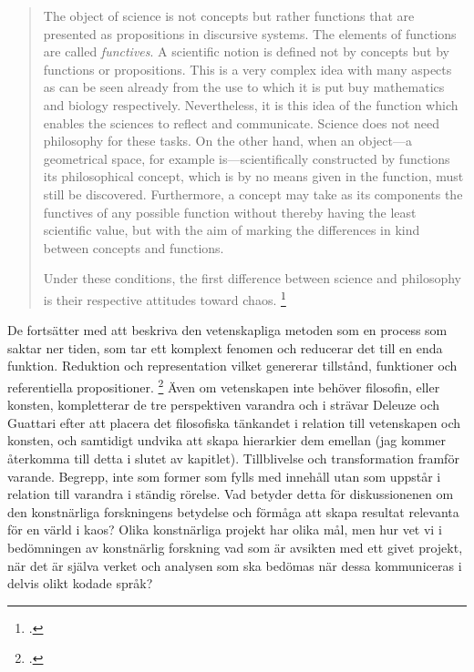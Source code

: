 \documentclass[11pt]{article}
\let\footnote=\endnote
\begin{document}
\begin{quote}
    The object of science is not concepts but rather functions that
    are presented as propositions in discursive systems. The elements
    of functions are called \emph{functives}. A scientific notion is
    defined not by concepts but by functions or propositions. This is
    a very complex idea with many aspects as can be seen already from
    the use to which it is put buy mathematics and biology
    respectively. Nevertheless, it is this idea of the function which
    enables the sciences to reflect and communicate. Science does not
    need philosophy for these tasks. On the other hand, when an
    object---a geometrical space, for example is---scientifically
    constructed by functions its philosophical concept, which is by no
    means given in the function, must still be
    discovered. Furthermore, a concept may take as its components the
    functives of any possible function without thereby having the
    least scientific value, but with the aim of marking the
    differences in kind between concepts and functions.

    Under these conditions, the first difference between science and
    philosophy is their respective attitudes toward
    chaos. \footcite[sid. 117-8]{deleuze1994}
\end{quote}

De fortsätter med att beskriva den vetenskapliga metoden som en
process som saktar ner tiden, som tar ett komplext fenomen och
reducerar det till en enda funktion. Reduktion och representation
vilket genererar tillstånd, funktioner och referentiella propositioner.
\footcite[sid. 197]{deleuze1994} Även om vetenskapen inte behöver
filosofin,\footnote{Närmast tvärtom mot vad de hävdade i \emph{Mille Plateaux}.} eller konsten, kompletterar de tre perspektiven varandra
och i  strävar Deleuze och Guattari efter att
placera det filosofiska tänkandet i relation till vetenskapen och
konsten, och samtidigt undvika att skapa hierarkier dem
emellan (jag kommer återkomma till detta i slutet av kapitlet). Tillblivelse och transformation framför varande. Begrepp,
inte som former som fylls med innehåll utan som uppstår i relation
till varandra i ständig rörelse. Vad betyder detta för diskussionenen om
den konstnärliga forskningens betydelse och förmåga att skapa resultat
relevanta för en värld i kaos? Olika konstnärliga projekt har olika
mål, men hur vet vi i bedömningen av konstnärlig forskning vad som är
avsikten med ett givet projekt, när det är själva verket och analysen
som ska bedömas när dessa kommuniceras i delvis olikt kodade språk?
\end{document}
